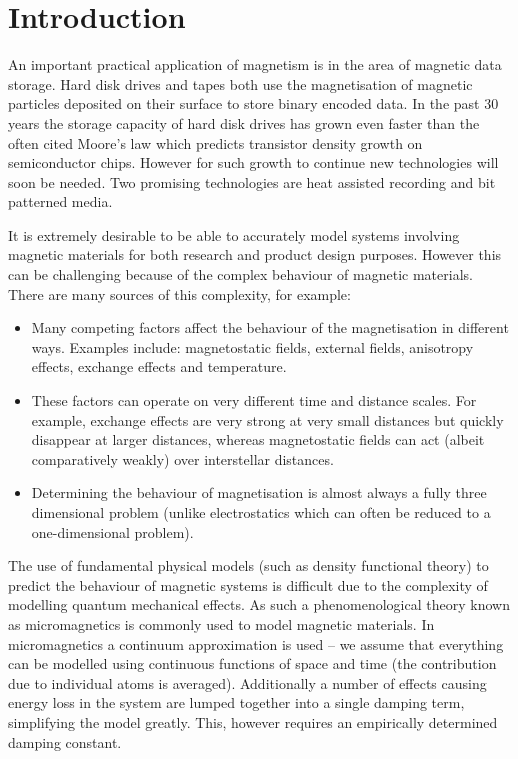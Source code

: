 
\section{Introduction}
\label{sec:introduction}

An important practical application of magnetism is in the area of magnetic data storage. Hard disk drives and tapes both use the magnetisation of magnetic particles deposited on their surface to store binary encoded data. In the past 30 years the storage capacity of hard disk drives has grown even faster than the often cited Moore's law which predicts transistor density growth on semiconductor chips. \cite{McDaniel2005} However for such growth to continue new technologies will soon be needed. %
Two promising technologies are heat assisted recording and bit patterned media.

It is extremely desirable to be able to accurately model systems involving magnetic materials for both research and product design purposes. However this can be challenging because of the complex behaviour of magnetic materials. There are many sources of this complexity, for example:
\begin{itemize}
\item Many competing factors affect the behaviour of the magnetisation in different ways. Examples include: magnetostatic fields, external fields, anisotropy effects, exchange effects and temperature.

\item These factors can operate on very different time and distance scales. For example, exchange effects are very strong at very small distances but quickly disappear at larger distances, whereas magnetostatic fields can act (albeit comparatively weakly) over interstellar distances.

\item Determining the behaviour of magnetisation is almost always a fully three dimensional problem (unlike electrostatics which can often be reduced to a one-dimensional problem).
\end{itemize}

The use of fundamental physical models (such as density functional theory) to predict the behaviour of magnetic systems is difficult due to the complexity of modelling quantum mechanical effects. As such a phenomenological theory known as micromagnetics is commonly used to model magnetic materials.\cite{Coey2010} \cite{Kronmuller2003} In micromagnetics a continuum approximation is used -- we assume that everything can be modelled using continuous functions of space and time (the contribution due to individual atoms is averaged). Additionally a number of effects causing energy loss in the system are lumped together into a single damping term, simplifying the model greatly. This, however requires an empirically determined damping constant.

